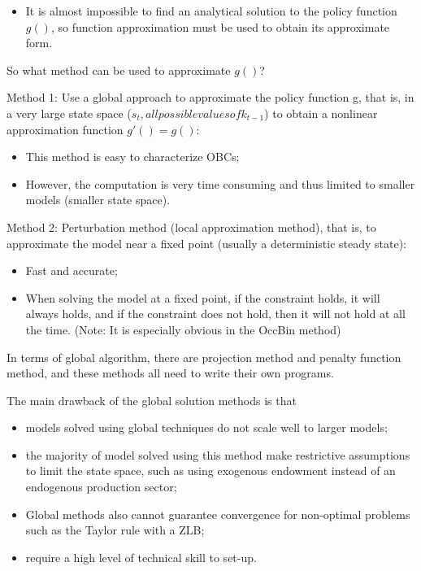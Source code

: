 \documentclass[10pt,math=newtx,citestyle=gb7714-2015,bibstyle=gb7714-2015]{elegantbook}
\begin{document}
{\begin{itemize}
	\item It is almost impossible to find an analytical solution to the policy function $g()$, so function approximation must be used to obtain its approximate form.
\end{itemize}

So what method can be used to approximate $g()$?

Method 1: Use a global approach to approximate the policy function g, that is, in a very large state space ($s_t, all possible values of k_{t-1}$) to obtain a nonlinear approximation function $g'()=g ()$:
\begin{itemize}
	\item This method is easy to characterize OBCs;
	
	\item However, the computation is very time consuming and thus limited to smaller models (smaller state space).
\end{itemize}

Method 2: Perturbation method (local approximation method), that is, to approximate the model near a fixed point (usually a deterministic steady state):
\begin{itemize}
	\item Fast and accurate;
	
	\item When solving the model at a fixed point, if the constraint holds, it will always holds, and if the constraint does not hold, then it will not hold at all the time. (Note: It is especially obvious in the OccBin method)
\end{itemize}


In terms of global algorithm, there are projection method and penalty function method, and these methods all need to write their own programs.

The main drawback of the global solution methods is that

\begin{itemize}
	\item models solved using global techniques do not scale well to larger models;
	\item the majority of model solved using this method make restrictive assumptions to limit the state space, such as using exogenous endowment instead of an endogenous production sector;
	\item Global methods also cannot guarantee convergence for non-optimal problems such as the Taylor rule with a ZLB;
	\item require a high level of technical skill to set-up.
\end{itemize}


}
\end{document}
